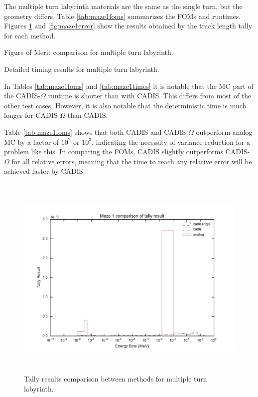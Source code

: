 The multiple turn labyrinth materials are the same as the single turn, but the geometry differs. Table
\ref{tab:maze1foms} summarizes the FOMs and runtimes. Figures \ref{fig:maze1result} and
\ref{fig:maze1error} show the results obtained by the track length tally for each
method.

\begin{table}[h!]
  \centering
  
  \caption[Figure of Merit comparison for multiple turn labyrinth.]{Figure of Merit
    comparison for multiple turn labyrinth.}
  \label{tab:maze1foms}
\end{table}

\begin{table}[h!]
  \centering
  
  \caption[Detailed timing results for multiple turn labyrinth.]
  {Detailed timing results for multiple turn labyrinth.}
  \label{tab:maze1times}
\end{table}

In Tables \ref{tab:maze1foms} and \ref{tab:maze1times}
it is notable that the MC part of the CADIS-$\Omega$ runtime is
shorter than with CADIS. This differs from most of the other
test cases. However, it is also notable that the
deterministic time is much longer for CADIS-$\Omega$ than CADIS.

Table \ref{tab:maze1foms} shows that both CADIS and CADIS-$\Omega$ outperform
analog MC by a factor of $10^2$ or $10^3$, indicating the necessity of variance
reduction for a problem like this. In comparing the FOMs, CADIS slightly outperforms
CADIS-$\Omega$ for all relative errors, meaning that the time
to reach any relative error will be achieved faster by CADIS.

\begin{figure}[h!]
  \centering
  \includegraphics[height=10cm]{./chapters/characterization_probs/figures/char/maze1/maze_1_tally_result_compare.pdf}
  \caption[Tally results comparison between methods for multiple turn labyrinth.]
  {Tally results comparison between methods for multiple turn labyrinth. }
  \label{fig:maze1result}
\end{figure}

